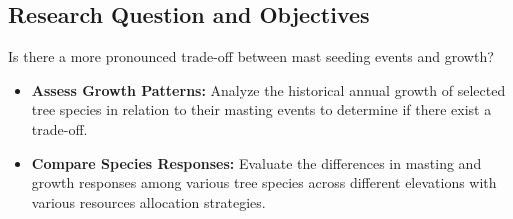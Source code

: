 \documentclass[11pt,letter]{article}
\begin{document}
\subsection{Research Question and Objectives}
Is there a more pronounced trade-off between mast seeding events and growth?
	\begin{itemize}
	\item \textbf{Assess Growth Patterns:} Analyze the historical annual growth of selected tree species in relation to their masting events to determine if there exist a trade-off.
	\item \textbf{Compare Species Responses:} Evaluate the differences in masting and growth responses among various tree species across different elevations with various resources allocation strategies.
	\end{itemize}
\end{document}
